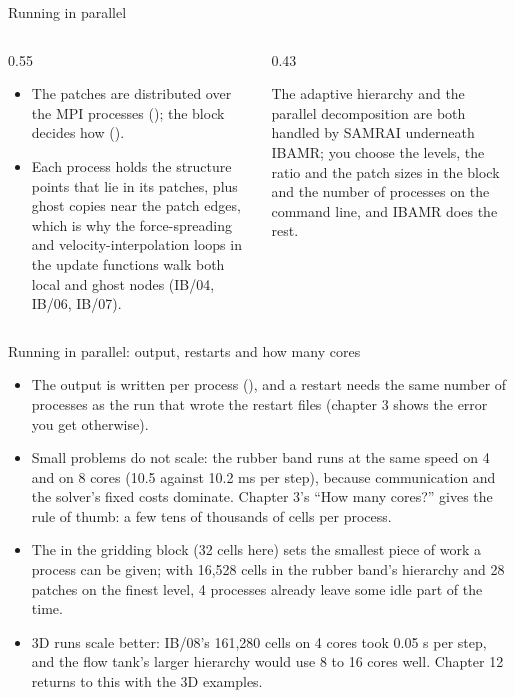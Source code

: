 \documentclass[aspectratio=169,11pt]{beamer}
\begin{document}
\begin{frame}{Running in parallel}
\begin{columns}[T,onlytextwidth]
\begin{column}{0.55\textwidth}
\begin{itemize}
  \item The patches are distributed over the MPI processes (); the  block decides how ().
  \item Each process holds the structure points that lie in its patches, plus ghost copies near the patch edges, which is why the force-spreading and velocity-interpolation loops in the update functions walk both local and ghost nodes (IB/04, IB/06, IB/07).
\end{itemize}
\end{column}
\begin{column}{0.43\textwidth}
\begin{punchbox}
\small The adaptive hierarchy and the parallel decomposition are both handled by SAMRAI underneath IBAMR; you choose the levels, the ratio and the patch sizes in the  block and the number of processes on the command line, and IBAMR does the rest.
\end{punchbox}
\end{column}
\end{columns}
\end{frame}

\begin{frame}{Running in parallel: output, restarts and how many cores}
\begin{itemize}
  \item The output is written per process (), and a restart needs the same number of processes as the run that wrote the restart files (chapter 3 shows the error you get otherwise).
  \item Small problems do not scale: the rubber band runs at the same speed on 4 and on 8 cores (10.5 against 10.2 ms per step), because communication and the solver's fixed costs dominate. Chapter 3's ``How many cores?'' gives the rule of thumb: a few tens of thousands of cells per process.
  \item The  in the gridding block (32 cells here) sets the smallest piece of work a process can be given; with 16,528 cells in the rubber band's hierarchy and 28 patches on the finest level, 4 processes already leave some idle part of the time.
  \item 3D runs scale better: IB/08's 161,280 cells on 4 cores took 0.05 s per step, and the flow tank's larger hierarchy would use 8 to 16 cores well. Chapter 12 returns to this with the 3D examples.
\end{itemize}
\end{frame}
\end{document}
